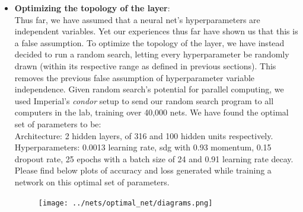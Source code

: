 \begin{itemize}[topsep=-10pt]
\item \textbf{Optimizing the topology of the layer}:\\
  Thus far, we have assumed that a neural net's hyperparameters are independent variables.
  Yet our experiences thus far have shown us that this is a false assumption.
  To optimize the topology of the layer, we have instead decided to run a random search,
  letting every hyperparameter be randomly drawn (within its respective range as defined in previous sections).
  This removes the previous false assumption of hyperparameter variable independence.
  Given random search's potential for parallel computing, we used Imperial's \emph{condor} setup to send our random search program
  to all computers in the lab, training over 40,000 nets.
  We have found the optimal set of parameters to be:\\
  Architecture: 2 hidden layers, of 316 and 100 hidden units respectively.\\
  Hyperparameters: 0.0013 learning rate, sdg with 0.93 momentum, 0.15 dropout rate, 25 epochs with a batch size of 24 and 0.91 learning rate decay.\\
  Please find below plots of accuracy and loss generated
  while training a network on this optimal set of parameters.
  \begin{figure}[!ht]
    \centering
        {{\texttt{[image: ../nets/optimal\_net/diagrams.png]}}}  
  \end{figure}


\end{itemize}
